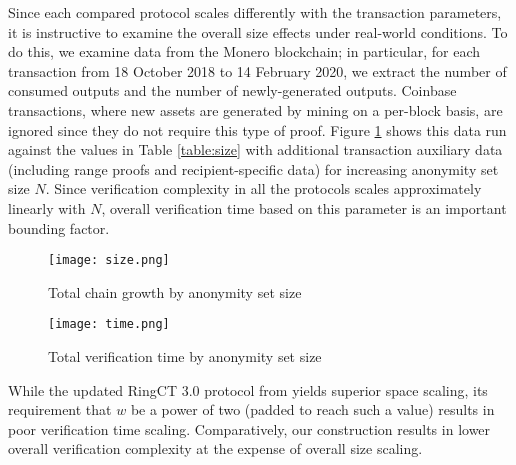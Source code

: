 \documentclass{article}
\theoremstyle{definition}
\begin{document}
Since each compared protocol scales differently with the transaction parameters, it is instructive to examine the overall size effects under real-world conditions.
To do this, we examine data from the Monero blockchain; in particular, for each transaction from 18 October 2018 to 14 February 2020, we extract the number of consumed outputs and the number of newly-generated outputs.
Coinbase transactions, where new assets are generated by mining on a per-block basis, are ignored since they do not require this type of proof.
Figure \ref{fig:size} shows this data run against the values in Table \ref{table:size} with additional transaction auxiliary data (including range proofs and recipient-specific data) for increasing anonymity set size $N$.
Since verification complexity in all the protocols scales approximately linearly with $N$, overall verification time based on this parameter is an important bounding factor.

\begin{figure}
\centering
\texttt{[image: size.png]}
\caption{Total chain growth by anonymity set size}
\label{fig:size}
\end{figure}

\begin{figure}
\centering
\texttt{[image: time.png]}
\caption{Total verification time by anonymity set size}
\label{fig:time}
\end{figure}

While the updated RingCT 3.0 protocol from \cite{rct3} yields superior space scaling, its requirement that $w$ be a power of two (padded to reach such a value) results in poor verification time scaling.
Comparatively, our construction results in lower overall verification complexity at the expense of overall size scaling.




\end{document}
